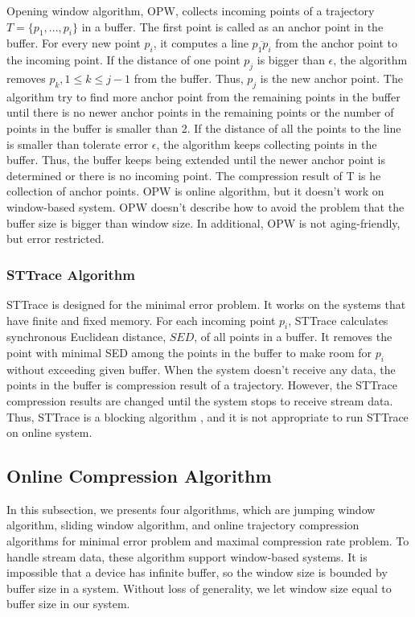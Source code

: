 \documentclass[12pt]{article}
\begin{document}
\begin{CJK}{UTF8}{bsmi}
Opening window algorithm\cite{2004:TDTROPW}, OPW, collects incoming points of a trajectory  $T= \{ p_1, ..., p_i \} $ in a buffer. The first point is called as an anchor point in the buffer. For every new point $p_i$, it computes a line $\overline{p_1 p_i}$ from the anchor point to the incoming point. If the distance of one point $p_j$ is bigger than $\epsilon$,  the algorithm removes $p_k, 1\leq k\leq j-1$ from the buffer. Thus, $p_j$ is the new anchor point. The algorithm try to find more anchor point from the remaining points in the buffer until there is no newer anchor points in the remaining points or the number of points in the buffer is smaller than 2. If the distance of all the points to the line is smaller than tolerate error $\epsilon$, the algorithm keeps collecting points in the buffer. Thus, the buffer keeps being extended until the newer anchor point is determined or there is no incoming point. The compression result of T is he collection of anchor points. OPW is online algorithm, but it doesn't work on window-based system. OPW doesn't describe how to avoid the problem that the buffer size is bigger than window size. In additional, OPW is not aging-friendly, but error restricted.



\subsubsection{STTrace Algorithm}

STTrace \cite{2006:STTrace} is designed for the minimal error problem. It works on the systems that have finite and fixed memory. For each incoming point $p_i$, STTrace calculates synchronous Euclidean distance, $SED$, of all points in a buffer. It removes the point with minimal SED among the points in the buffer to make room for $p_i$ without exceeding given buffer. When the system doesn't receive any data, the points in the buffer is compression result of a trajectory. However, the STTrace compression results are changed until the system stops to receive stream data. Thus, STTrace is a blocking algorithm , and it is not appropriate to run STTrace on online system.



\subsection{Online Compression Algorithm}

In this subsection, we presents four algorithms, which are jumping window algorithm, sliding window algorithm, and online trajectory compression algorithms for minimal error problem and maximal compression rate problem. To handle stream data, these algorithm support window-based systems. It is impossible that a device has infinite buffer, so the window size is bounded by buffer size in a system. Without loss of generality, we let window size equal to buffer size in our system.\\


\end{CJK}
\end{document}
